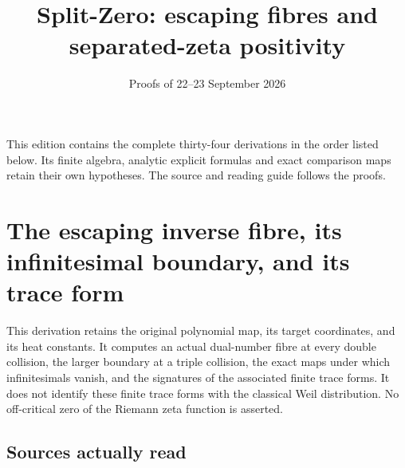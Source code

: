 \documentclass[
  10pt,
  a4paper,
]{article}
\title{Split-Zero: escaping fibres and separated-zeta positivity}
\author{}
\date{Proofs of 22--23 September 2026}
\begin{document}
\maketitle

{
\setcounter{tocdepth}{3}
\tableofcontents
}
This edition contains the complete thirty-four derivations in the order
listed below. Its finite algebra, analytic explicit formulas and exact
comparison maps retain their own hypotheses. The source and reading
guide follows the proofs.

\clearpage

\section{The escaping inverse fibre, its infinitesimal boundary, and its
trace
form}\label{the-escaping-inverse-fibre-its-infinitesimal-boundary-and-its-trace-form}

This derivation retains the original polynomial map, its target
coordinates, and its heat constants. It computes an actual dual-number
fibre at every double collision, the larger boundary at a triple
collision, the exact maps under which infinitesimals vanish, and the
signatures of the associated finite trace forms. It does not identify
these finite trace forms with the classical Weil distribution. No
off-critical zero of the Riemann zeta function is asserted.

\subsection{Sources actually read}\label{sources-actually-read}
\end{document}
